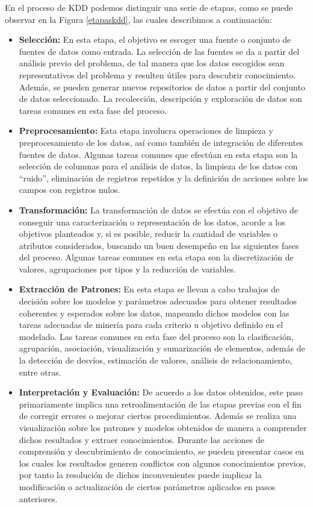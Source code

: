 {En el proceso de KDD podemos distinguir una serie de etapas, como se puede observar en la Figura \ref{etapaskdd}, las cuales describimos a continuaci\'on:

\begin{itemize}

\item \textbf{Selecci\'on:} En esta etapa, el objetivo es escoger una fuente o conjunto de fuentes de datos como entrada. La selecci\'on de las fuentes se da a partir del an\'alisis previo del problema, de tal manera que los datos escogidos sean representativos del problema y resulten \'utiles para descubrir conocimiento. Adem\'as, se pueden generar nuevos repositorios de datos a partir del conjunto de datos seleccionado. La recolecci\'on, descripci\'on y exploraci\'on de datos son tareas comunes en esta fase del proceso.
\item \textbf{Preprocesamiento:} Esta etapa involucra operaciones de limpieza y preprocesamiento de los datos, as\'i como tambi\'en de integraci\'on de diferentes fuentes de datos. Algunas tareas comunes que efect\'uan en esta etapa son la selecci\'on de columnas para el an\'alisis de datos, la limpieza de los datos con ``ruido'', eliminaci\'on de registros repetidos y la definici\'on de acciones sobre los campos con registros nulos.
\item \textbf{Transformaci\'on:} La transformaci\'on de datos se efect\'ua con el objetivo de conseguir una caracterizaci\'on o representaci\'on de los datos, acorde a los objetivos planteados y, si es posible, reducir la cantidad de variables o atributos considerados, buscando un buen desempe\~no en las siguientes fases del proceso. Algunas tareas comunes en esta etapa son la discretizaci\'on de valores, agrupaciones por tipos y la reducci\'on de variables.
\item \textbf{Extracci\'on de Patrones:} En esta etapa se llevan a cabo trabajos de decisi\'on sobre los modelos y par\'ametros adecuados para obtener resultados coherentes y esperados sobre los datos, mapeando dichos modelos con las tareas adecuadas de miner\'ia para cada criterio u objetivo definido en el modelado. Las tareas comunes en esta fase del proceso son la clasificaci\'on, agrupaci\'on, asociaci\'on, visualizaci\'on y sumarizaci\'on de elementos, adem\'as de la detecci\'on de desv\'ios, estimaci\'on de valores, an\'alisis de relacionamiento, entre otras.
\item \textbf{Interpretaci\'on y Evaluaci\'on:} De acuerdo a los datos obtenidos, este paso primariamente implica una retroalimentaci\'on de las etapas previas con el fin de corregir errores o mejorar ciertos procedimientos. Adem\'as se realiza una visualizaci\'on sobre los patrones y modelos obtenidos de manera a comprender dichos resultados y extraer conocimientos. Durante las acciones de comprensi\'on y descubrimiento de conocimiento, se pueden presentar casos en los cuales los resultados generen conflictos con algunos conocimientos previos, por tanto la resoluci\'on de dichos inconvenientes puede implicar la modificaci\'on o actualizaci\'on de ciertos par\'ametros aplicados en pasos anteriores.


\end{itemize}}
